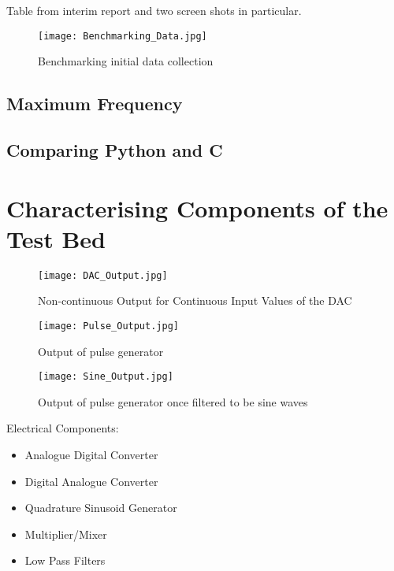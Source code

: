 \documentclass[../main.tex]{subfiles}
\begin{document}
Table from interim report and two screen shots in particular.\\

\begin{figure}[ht]
	\centering
	\texttt{[image: Benchmarking\_Data.jpg]}
	\caption{Benchmarking initial data collection}
\end{figure}

\subsection{Maximum Frequency}


\subsection{Comparing Python and C} \label{sec_Comparing Python and C}

\clearpage


\section{Characterising Components of the Test Bed} \label{sec_Components}

\begin{figure}[ht]
	\centering
	\texttt{[image: DAC\_Output.jpg]}
	\caption{Non-continuous Output for Continuous Input Values of the DAC}
\end{figure}

\begin{figure}[ht]
	\centering
	\texttt{[image: Pulse\_Output.jpg]}
	\caption{Output of pulse generator}
\end{figure}

\begin{figure}[ht]
	\centering
	\texttt{[image: Sine\_Output.jpg]}
	\caption{Output of pulse generator once filtered to be sine waves}
\end{figure}



Electrical Components:
\begin{itemize}
	\item Analogue Digital Converter
	\item Digital Analogue Converter
	\item Quadrature Sinusoid Generator
	\item Multiplier/Mixer
	\item Low Pass Filters
\end{itemize}
\end{document}
